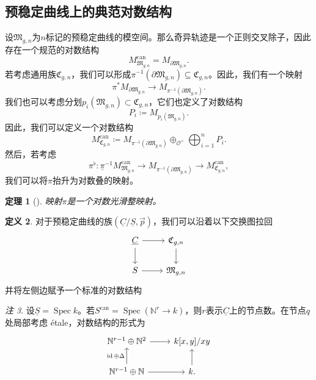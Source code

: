 \documentclass{amsart}
\newtheorem{thm}{定理}[section]
\theoremstyle{definition}
\newtheorem{defn}[thm]{定义}
\theoremstyle{remark}
\newtheorem{rmk}[thm]{注}
\theoremstyle{plain}
\theoremstyle{definition}
\theoremstyle{remark}
\newcommand{\N}{\mathbb{N}}
\newcommand{\mc}[1]{\mathcal{#1}}
\newcommand{\mf}[1]{\mathfrak{#1}}
\newcommand{\on}[1]{\operatorname{#1}}
\newcommand{\ul}[1]{\underline{#1}}
\newcommand{\1}{\mathbf{1}}
\newcommand{\2}{\mathbf{2}}
\newcommand{\3}{\mathbf{3}}
\DeclareMathOperator{\Spec}{Spec}
\begin{document}
\subsection{预稳定曲线上的典范对数结构}%
\label{sub:Canonical log structures on prestable curves}

设\(\mf{M}_{g,n}\)为\(n\)标记的预稳定曲线的模空间。那么奇异轨迹是一个正则交叉除子，因此存在一个规范的对数结构
\[ M_{\mf{M}_{g,n}}^{\on{can}} = M_{\partial \mf{M}_{g,n}}. \]
若考虑通用族\(\mf{C}_{g,n}\)，我们可以形成\(\pi^{-1}(\partial \mf{M}_{g,n}) \subseteq \mf{C}_{g,n}\)。因此，我们有一个映射
\[ \pi^* M_{\partial \mf{M}_{g,n}} \to M_{\pi^{-1}(\partial \mf{M}_{g,n})}. \]
我们也可以考虑分划\(p_i(\mf{M}_{g,n}) \subset \mf{C}_{g,n}\)，它们也定义了对数结构
\[ P_i \coloneqq M_{p_i(\mf{M}_{g,n})}. \]
因此，我们可以定义一个对数结构
\[ M_{\mf{C}_{g,n}}^{\on{can}} \coloneqq M_{\pi^{-1}(\partial\mf{M}_{g,n})} \oplus_{\mc{O}^{\times}} \bigoplus_{i=1}^n P_i. \]
然后，若考虑
\[ \pi^{\flat} \colon \ul{\pi}^{-1} M_{\mf{M}_{g,n}}^{\on{can}} \to M_{\pi^{-1}(\partial \mf{M}_{g,n})} \to M_{\mf{C}_{g,n}}^{\on{can}}, \]
我们可以将\(\pi\)抬升为对数叠的映射。

\begin{thm}[{\cite{FKato2000}}]
映射\(\pi\)是一个对数光滑整映射。
\end{thm}

\begin{defn}
    对于预稳定曲线的族\((\ul{C}/\ul{S}, \vec{p})\)，我们可以沿着以下交换图拉回
    \begin{equation*}
    \begin{tikzcd}
        \ul{C} \ar{r} \ar{d} & \mf{C}_{g,n} \ar{d} \\
        S \ar{r} & \mf{M}_{g,n}
    \end{tikzcd}
    \end{equation*}
并将左侧边赋予一个标准的对数结构
\end{defn}

\begin{rmk}
设\(\ul{S} = \Spec k\)。若\(S^{\on{can}} = \Spec (\N^r \to k)\)，则\(r\)表示\(\ul{C}\)上的节点数。在节点\(q\)处局部考虑 \'etale，对数结构的形式为
    \begin{equation*}
    \begin{tikzcd}
        \N^{r-1} \oplus \N^2 \ar{r} & k[x,y]/xy \\
        \N^{r-1} \oplus \N \ar{u}{\on{id}\oplus\Delta} \ar{r} & k \ar{u}.
    \end{tikzcd}
    \end{equation*}
\end{rmk}
\end{document}
